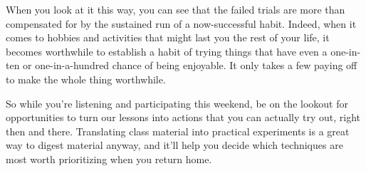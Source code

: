 When you look at it this way, you can see that the failed trials are more than compensated for by the sustained run of a now-successful habit.  Indeed, when it comes to hobbies and activities that might last you the rest of your life, it becomes worthwhile to establish a habit of trying things that have even a one-in-ten or one-in-a-hundred chance of being enjoyable.  It only takes a few paying off to make the whole thing worthwhile.

So while you're listening and participating this weekend, be on the lookout for opportunities to turn our lessons into actions that you can actually try out, right then and there.  Translating class material into practical experiments is a great way to digest material anyway, and it'll help you decide which techniques are most worth prioritizing when you return home.
